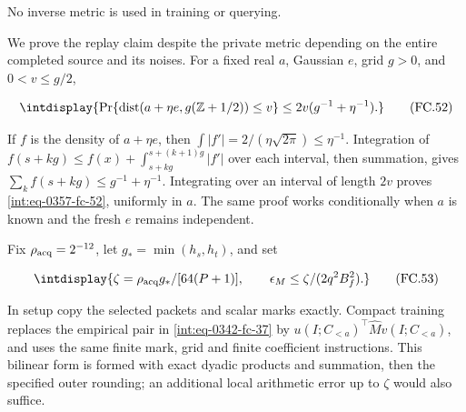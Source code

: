 
No inverse metric is used in training or querying.



We prove the replay claim despite the private metric depending on the entire completed source and its noises. For a fixed real \(a\), Gaussian \(e\), grid \(g>0\), and \(0<v\le g/2\),


\begingroup\renewcommand{\theHequation}{intdisplay.758}
\begin{equation}
\intdisplay{
\Pr\{\operatorname{dist}(a+\eta e,g(\mathbb Z+1/2))\le v\}
\le2v(g^{-1}+\eta^{-1}).
}
\tag{FC.52}
\label{int:eq-0357-fc-52}
\end{equation}
\endgroup


If \(f\) is the density of \(a+\eta e\), then \(\int|f'|=2/(\eta\sqrt{2\pi})\le\eta^{-1}\). Integration of \(f(s+kg)\le f(x)+\int_{s+kg}^{s+(k+1)g}|f'|\) over each interval, then summation, gives \(\sum_k f(s+kg)\le g^{-1}+\eta^{-1}\). Integrating over an interval of length \(2v\) proves \eqref{int:eq-0357-fc-52}, uniformly in \(a\). The same proof works conditionally when \(a\) is known and the fresh \(e\) remains independent.



Fix \(\rho_{\rm acq}=2^{-12}\), let \(g_\ast=\min(h_s,\allowbreak h_t)\), and set


\begingroup\renewcommand{\theHequation}{intdisplay.759}
\begin{equation}
\intdisplay{
\zeta=\rho_{\rm acq}g_\ast/[64(P+1)],\qquad
\epsilon_M\le\zeta/(2q^2B_f^2).
}
\tag{FC.53}
\label{int:eq-0358-fc-53}
\end{equation}
\endgroup


In setup copy the selected packets and scalar marks exactly. Compact training replaces the empirical pair in \eqref{int:eq-0342-fc-37} by \(u(I;C_{<a})^\top\widehat Mv(I;C_{<a})\), and uses the same finite mark, grid and finite coefficient instructions. This bilinear form is formed with exact dyadic products and summation, then the specified outer rounding; an additional local arithmetic error up to \(\zeta\) would also suffice.



